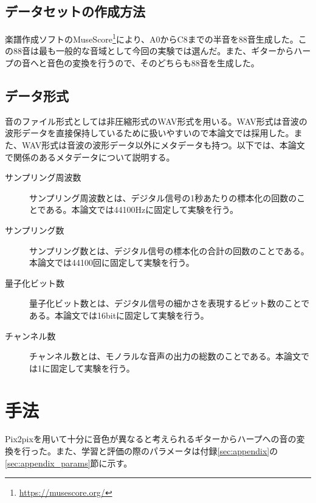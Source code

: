 \subsection{データセットの作成方法}

楽譜作成ソフトのMuseScore\footnote{\url{https://musescore.org/}}により、A0からC8までの半音を88音生成した。この88音は最も一般的な音域として今回の実験では選んだ。また、ギターからハープの音へと音色の変換を行うので、そのどちらも88音を生成した。

\subsection{データ形式}

音のファイル形式としては非圧縮形式のWAV形式を用いる。WAV形式は音波の波形データを直接保持しているために扱いやすいので本論文では採用した。また、WAV形式は音波の波形データ以外にメタデータも持つ。以下では、本論文で関係のあるメタデータについて説明する。

\begin{description}

\item[サンプリング周波数]\mbox{}

サンプリング周波数とは、デジタル信号の1秒あたりの標本化の回数のことである。本論文では44100Hzに固定して実験を行う。

\item[サンプリング数]\mbox{}

サンプリング数とは、デジタル信号の標本化の合計の回数のことである。本論文では44100回に固定して実験を行う。

\item[量子化ビット数]\mbox{}

量子化ビット数とは、デジタル信号の細かさを表現するビット数のことである。本論文では16bitに固定して実験を行う。

\item[チャンネル数]\mbox{}

チャンネル数とは、モノラルな音声の出力の総数のことである。本論文では1に固定して実験を行う。

\end{description}

\section{手法}

Pix2pixを用いて十分に音色が異なると考えられるギターからハープへの音の変換を行った。また、学習と評価の際のパラメータは付録\ref{sec:appendix}の\ref{sec:appendix_params}節に示す。

